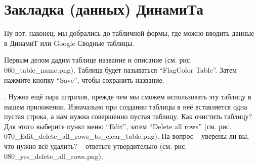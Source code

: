 \section{Закладка (данных) ДинамиТа}

Ну вот, наконец, мы добрались до табличной формы, где можно вводить данные в ДинамиТ или Google Сводные таблицы.

Первым делом дадим таблице название и описание (см. рис. 060\_table\_name.png). 
Таблица будет называться ``FlagColor Table''. Затем нажмите кнопку ``Save'', чтобы сохранить название.

. Нужна ещё пара штрихов, прежде чем мы сможем использовать эту таблицу в нашем приложении. 
Изначально при создании таблицы в неё вставляется одна пустая строка, а нам нужна совершенно пустая таблицу. Как очистить таблицу? 
Для этого выберите пункт меню ``Edit'', затем ``Delete all rows'' (см. рис. 070\_Edit\_delete\_all\_rows\_to\_clear\_table.png). 
На вопрос -- уверены ли вы, что нужно всё удалить? -- ответьте утвердительно (см. рис. 080\_yes\_delete\_all\_rows.png).


